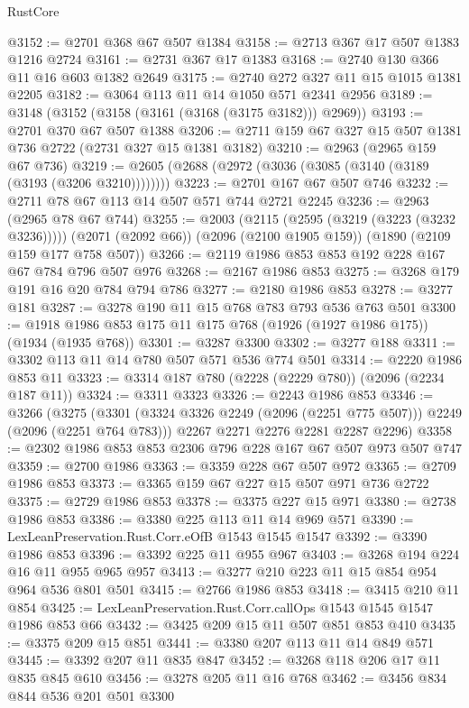 \begin{lexlean}{RustCore}
\begin{coremodule}
@3152 := @2701 @368 @67 @507 @1384
@3158 := @2713 @367 @17 @507 @1383 @1216 @2724
@3161 := @2731 @367 @17 @1383
@3168 := @2740 @130 @366 @11 @16 @603 @1382 @2649
@3175 := @2740 @272 @327 @11 @15 @1015 @1381 @2205
@3182 := @3064 @113 @11 @14 @1050 @571 @2341 @2956
@3189 := @3148 (@3152 (@3158 (@3161 (@3168 (@3175 @3182))) @2969))
@3193 := @2701 @370 @67 @507 @1388
@3206 := @2711 @159 @67 @327 @15 @507 @1381 @736 @2722 (@2731 @327 @15 @1381 @3182)
@3210 := @2963 (@2965 @159 @67 @736)
@3219 := @2605 (@2688 (@2972 (@3036 (@3085 (@3140 (@3189 (@3193 (@3206 @3210))))))))
@3223 := @2701 @167 @67 @507 @746
@3232 := @2711 @78 @67 @113 @14 @507 @571 @744 @2721 @2245
@3236 := @2963 (@2965 @78 @67 @744)
@3255 := @2003
    (@2115 (@2595 (@3219 (@3223 (@3232 @3236)))))
    (@2071 (@2092 @66))
    (@2096 (@2100 @1905 @159))
    (@1890 (@2109 @159 @177 @758 @507))
@3266 := @2119 @1986 @853 @853 @192 @228 @167 @67 @784 @796 @507 @976
@3268 := @2167 @1986 @853
@3275 := @3268 @179 @191 @16 @20 @784 @794 @786
@3277 := @2180 @1986 @853
@3278 := @3277 @181
@3287 := @3278 @190 @11 @15 @768 @783 @793 @536 @763 @501
@3300 := @1918 @1986 @853 @175 @11 @175 @768 (@1926 (@1927 @1986 @175)) (@1934 (@1935 @768))
@3301 := @3287 @3300
@3302 := @3277 @188
@3311 := @3302 @113 @11 @14 @780 @507 @571 @536 @774 @501
@3314 := @2220 @1986 @853 @11
@3323 := @3314 @187 @780 (@2228 (@2229 @780)) (@2096 (@2234 @187 @11))
@3324 := @3311 @3323
@3326 := @2243 @1986 @853
@3346 := @3266
    (@3275
      (@3301 (@3324 @3326 @2249 (@2096 (@2251 @775 @507))) @2249 (@2096 (@2251 @764 @783)))
      @2267
      @2271
      @2276
      @2281
      @2287
      @2296)
@3358 := @2302 @1986 @853 @853 @2306 @796 @228 @167 @67 @507 @973 @507 @747
@3359 := @2700 @1986
@3363 := @3359 @228 @67 @507 @972
@3365 := @2709 @1986 @853
@3373 := @3365 @159 @67 @227 @15 @507 @971 @736 @2722
@3375 := @2729 @1986 @853
@3378 := @3375 @227 @15 @971
@3380 := @2738 @1986 @853
@3386 := @3380 @225 @113 @11 @14 @969 @571
@3390 := LexLeanPreservation.Rust.Corr.eOfB @1543 @1545 @1547
@3392 := @3390 @1986 @853
@3396 := @3392 @225 @11 @955 @967
@3403 := @3268 @194 @224 @16 @11 @955 @965 @957
@3413 := @3277 @210 @223 @11 @15 @854 @954 @964 @536 @801 @501
@3415 := @2766 @1986 @853
@3418 := @3415 @210 @11 @854
@3425 := LexLeanPreservation.Rust.Corr.callOps @1543 @1545 @1547 @1986 @853 @66
@3432 := @3425 @209 @15 @11 @507 @851 @853 @410
@3435 := @3375 @209 @15 @851
@3441 := @3380 @207 @113 @11 @14 @849 @571
@3445 := @3392 @207 @11 @835 @847
@3452 := @3268 @118 @206 @17 @11 @835 @845 @610
@3456 := @3278 @205 @11 @16 @768
@3462 := @3456 @834 @844 @536 @201 @501 @3300

\end{coremodule}
\end{lexlean}
